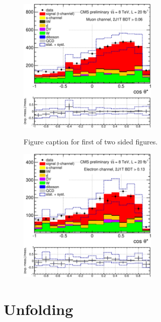 \documentclass[a4paper]{jpconf}
\begin{document}
\begin{figure}[h]
\begin{center}
\begin{minipage}{7cm}
\includegraphics[height=6.5cm]{2j1t_cosTheta_mu-crop}
\caption{\label{fig:cosTheta_mu}Figure caption for first of two sided figures.}
\end{minipage}\hspace{1cm}%
\begin{minipage}{7cm}
\includegraphics[height=6.5cm]{2j1t_cosTheta_el-crop}
\caption{\label{fig:cosTheta_el}}
\end{minipage} 
\end{center}
\end{figure}

\section{Unfolding}
\end{document}

